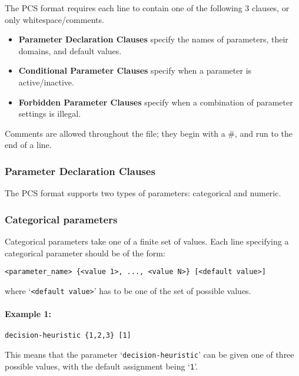 \documentclass[manual.tex]{subfiles}
\begin{document}
The PCS format requires each line to contain one of the following 3 clauses, or only whitespace/comments.
\begin{itemize}
\item \textbf{Parameter Declaration Clauses} specify the names of parameters, their domains, and default values.
\item \textbf{Conditional Parameter Clauses} specify when a parameter is active/inactive.
\item \textbf{Forbidden Parameter Clauses} specify when a combination of parameter settings is illegal.
\end{itemize}
Comments are allowed throughout the file; they begin with a \#, and run to the end of a line. 

\subsubsection{Parameter Declaration Clauses}\label{sec:param_decl_clauses}

The PCS format supports two types of parameters: categorical and numeric. 

\subsubsection*{Categorical parameters} \label{sec:categorical-params}
Categorical parameters take one of a finite set of values. Each line specifying a categorical parameter should be of the form:

\begin{verbatim}
<parameter_name> {<value 1>, ..., <value N>} [<default value>]
\end{verbatim}
where `\texttt{<default value>}' has to be one of the set of possible values. 

\paragraph{Example 1:}
\begin{verbatim}
decision-heuristic {1,2,3} [1]
\end{verbatim}
This means that the parameter `\texttt{decision-heuristic}' can be given one of three possible values, with the default assignment being `\texttt{1}'.
\end{document}

